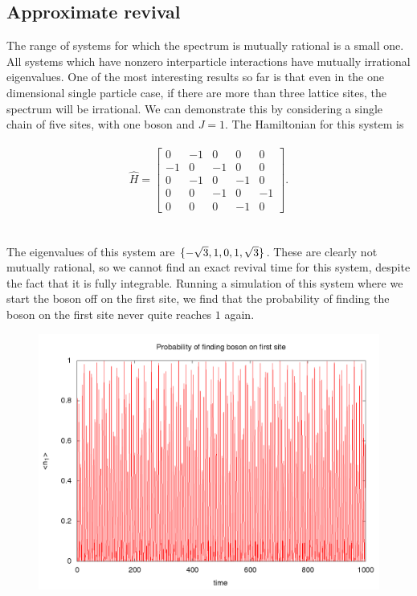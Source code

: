 \documentclass[a4paper,10pt]{article}
\begin{document}
\subsection{Approximate revival}
The range of systems for which the spectrum  is mutually rational is a small one. 
All systems which have nonzero interparticle interactions have mutually irrational eigenvalues. One of the most interesting results so far is that even in the one dimensional single particle case,
if there are more than three lattice sites, the spectrum will be irrational. We can demonstrate this by considering a single chain of five sites, with one boson and $J=1$. The Hamiltonian for this 
system is \\\\
\begin{equation}
\hat{H}= \begin{bmatrix}
 0 & -1 & 0 & 0 & 0\\
 -1 & 0 & -1 & 0 & 0\\
 0 & -1 & 0 & -1 & 0\\
 0 & 0 & -1 & 0 & -1\\
 0 & 0 & 0 & -1 & 0
 \end{bmatrix}.
\end{equation}
\\\\
The eigenvalues of this system are $\{-\sqrt{3},\-1,0,1,\sqrt{3}\}$. These are clearly not mutually rational, so we cannot find an exact revival time for this system, despite the fact that it is 
fully integrable. Running a simulation of this system where we start the boson off on the first site, we find that the probability of finding the boson on the first site never quite reaches $1$ again.


\begin{figure}[H]
 \includegraphics[width=1.0\textwidth]{5_by_1_T1e4_U0}
 \centering
\end{figure}
\end{document}
